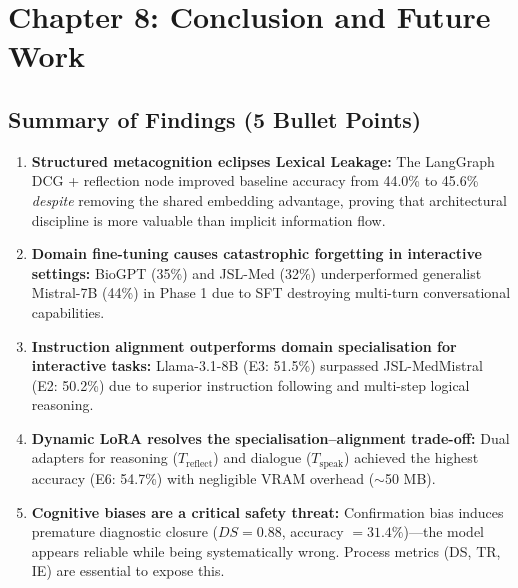 \section{Chapter 8: Conclusion and Future Work}
\label{ch:conclusion}

\subsection{Summary of Findings (5 Bullet Points)}

\begin{enumerate}[label=\textbf{\arabic*.}]
    \item \textbf{Structured metacognition eclipses Lexical Leakage:} The LangGraph DCG + reflection node improved baseline accuracy from 44.0\% to 45.6\% \textit{despite} removing the shared embedding advantage, proving that architectural discipline is more valuable than implicit information flow.
    
    \item \textbf{Domain fine-tuning causes catastrophic forgetting in interactive settings:} BioGPT (35\%) and JSL-Med (32\%) underperformed generalist Mistral-7B (44\%) in Phase 1 due to SFT destroying multi-turn conversational capabilities.
    
    \item \textbf{Instruction alignment outperforms domain specialisation for interactive tasks:} Llama-3.1-8B (E3: 51.5\%) surpassed JSL-MedMistral (E2: 50.2\%) due to superior instruction following and multi-step logical reasoning.
    
    \item \textbf{Dynamic LoRA resolves the specialisation--alignment trade-off:} Dual adapters for reasoning ($T_{\text{reflect}}$) and dialogue ($T_{\text{speak}}$) achieved the highest accuracy (E6: 54.7\%) with negligible VRAM overhead ($\sim$50 MB).
    
    \item \textbf{Cognitive biases are a critical safety threat:} Confirmation bias induces premature diagnostic closure ($DS = 0.88$, accuracy $= 31.4\%$)---the model appears reliable while being systematically wrong. Process metrics (DS, TR, IE) are essential to expose this.
\end{enumerate}

